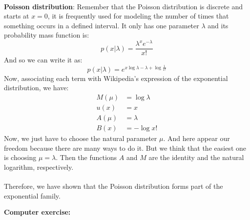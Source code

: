 \documentclass[10pt]{article}
\begin{document}
\newpage
\ \\
\Large{\textbf{Poisson distribution}}: 
\Large
Remember that the Poisson distribution is discrete and starts at $x=0$, it is frequently used for modeling the number of times that something occurs in a defined interval. It only has one parameter $\lambda$ and its probability mass function is:
$$
p(x|\lambda)= \frac{\lambda^x e^{-\lambda}}{x!}
$$
And so we can write it as:
$$
p(x|\lambda)= e^{x\log \lambda - \lambda + \log \frac{1}{x!}}
$$
Now, associating each term with Wikipedia's expression of the exponential distribution, we have:
\begin{equation*}
\begin{split}
   M(\mu) &=\log \lambda \\
   u(x)   &=x  \\
   A(\mu) &=\lambda \\
   B(x)   &= -\log x!
\end{split}
\end{equation*}
Now, we just have to choose the natural parameter $\mu$. And here appear our freedom because there are many ways to do it. But we think that the easiest one is choosing $\mu=\lambda$. Then the functions $A$ and $M$ are the identity and the natural logarithm, respectively. \\ \ \\
Therefore, we have shown that the Poisson distribution forms part of the exponential family.

\newpage
\Huge{\textbf{Computer exercise:}} \\ \ \\
\end{document}

